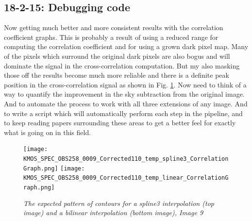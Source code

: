 \documentclass{literature}
\begin{document}
\subsection{18-2-15: Debugging code}
Now getting much better and more consistent results with the correlation coefficient graphs. This is probably a result of using a reduced range for computing the correlation coefficient and for using a grown dark pixel map. Many of the pixels which surround the original dark pixels are also bogus and will dominate the signal in the cross-correlation computation. But my also masking those off the results become much more reliable and there is a definite peak position in the cross-correlation signal as shown in Fig. \ref{fig:rho_plot_better}. Now need to think of a way to quantify the improvement in the sky subtraction from the original image. And to automate the process to work with all three extensions of any image. And to write a script which will automatically perform each step in the pipeline, and to keep reading papers surrounding these areas to get a better feel for exactly what is going on in this field.

\begin{figure}[!htp]
\centering
\texttt{[image: KMOS\_SPEC\_OBS258\_0009\_Corrected110\_temp\_spline3\_CorrelationGraph.png]}
\texttt{[image: KMOS\_SPEC\_OBS258\_0009\_Corrected110\_temp\_linear\_CorrelationGraph.png]}
\caption{\footnotesize{\emph{The expected pattern of contours for a spline3 interpolation (top image) and a bilinear interpolation (bottom image), Image 9}}}
\label{fig:rho_plot_better}
\end{figure} 
\end{document}
